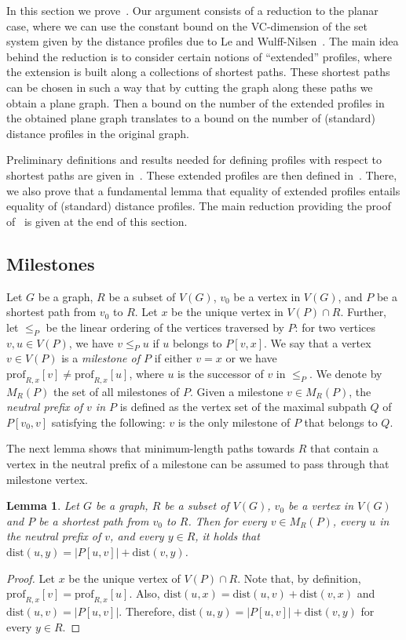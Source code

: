 \documentclass[11pt,a4paper]{article}
\newtheorem{lemma}{Lemma}[section]
\newcommand{\distprofile}[3]{\mathrm{prof}_{#1,#2}[#3]}
\newcommand{\dist}{\mathrm{dist}}
\renewcommand{\le}{\leqslant}
\begin{document}
In this section we prove~. Our argument consists of a reduction to the planar case, where we can use the constant bound on the VC-dimension of the set system given by the distance profiles due to Le and Wulff-Nilsen~\cite{LeW24}.
The main idea behind the reduction is to consider certain notions of ``extended'' profiles, where the extension is built along a collections of shortest paths. These shortest paths can be chosen in such a way that by cutting the graph along these paths we obtain a plane graph. Then a bound on the number of the extended profiles in the obtained plane graph translates to a bound on the number of (standard) distance profiles in the original graph.

Preliminary definitions and results needed for defining profiles with respect to shortest paths are given in~.
These extended profiles are then defined in~. There, we also prove that a fundamental lemma that equality of extended profiles entails equality of (standard) distance profiles.
The main reduction providing the proof of~ is given at the end of this section.

\subsection{Milestones}
\label{subsec:milestones}

Let $G$ be a graph, $R$ be a subset of $V(G)$,
$v_0$ be a vertex in $V(G)$, and $P$ be a shortest path from $v_0$ to $R$. Let $x$ be the unique vertex in $V(P)\cap R$. Further, let $\le_P$ be the linear ordering of the vertices traversed by $P$: for two vertices $v,u\in V(P)$, we have $v\le_P u$ if $u$ belongs to $P[v,x]$.
We say that a vertex $v\in V(P)$ is a \emph{milestone of $P$}
if either $v=x$ or we have $\distprofile{R}{x}{v}\neq\distprofile{R}{x}{u}$, where $u$ is the successor of $v$ in $\le_P$.
We denote by $M_{R}(P)$ the set of all milestones of $P$.
Given a milestone $v\in M_{R}(P)$,
the \emph{neutral prefix of $v$ in $P$} is defined as the vertex set of the maximal subpath $Q$ of $P[v_0,v]$ satisfying the following: $v$ is the only milestone of $P$ that belongs to $Q$.

The next lemma shows that minimum-length paths towards $R$ that contain a vertex in the neutral prefix of a milestone can be assumed to pass through that milestone vertex.

\begin{lemma}
  \label{lem:dispref}
  Let $G$ be a graph, $R$ be a subset of $V(G)$, $v_0$ be a vertex in $V(G)$ and $P$ be a shortest path from $v_0$ to $R$.
  Then for every $v\in M_R(P)$, every $u$ in the neutral prefix of $v$, and every $y\in R$, it holds that
  $\dist(u,y)=|P[u,v]|+\dist(v,y)$. 
\end{lemma}
\begin{proof}
  Let $x$ be the unique vertex of $V(P)\cap R$. Note that, by definition, $\distprofile{R}{x}{v}=\distprofile{R}{x}{u}$.
  Also, $\dist(u,x)=\dist(u,v)+\dist(v,x)$ and $\dist(u,v)=|P[u,v]|$. Therefore, $\dist(u,y)=|P[u,v]|+\dist(v,y)$ for every $y\in R$.
\end{proof}
\end{document}
